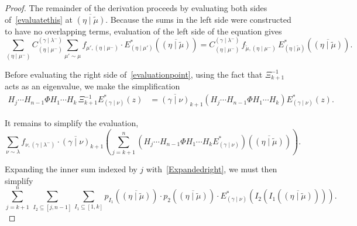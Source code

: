 \documentclass[11pt]{article}
\theoremstyle{definition}
\numberwithin{equation}{section}
\newcommand{\Estar}[1]{E^*_{#1}}
\newcommand{\gammalambdamin}{{(\gamma \mid \lambda^-)}}
\newcommand{\gammanu}{{(\gamma \mid \nu)}}
\newcommand{\etamu}{{(\eta \mid \mu^-)}}
\newcommand{\etamuprime}{{(\eta \mid \mu')}}
\newcommand{\mutilde}{{\widetilde{\mu}}}
\newcommand{\etamutilde}{{(\eta \mid \widetilde{\mu})}}
\newcommand{\pIoneevaluated}{p_{I_1}\left(\overline{\etamutilde}\right)}
\newcommand{\pItwoevaluated}{p_{2}\left(\overline{\etamutilde}\right)}
\newcommand{\fnu}{f_{\nu, \gammalambdamin}}
\newcommand{\gmutilde}{f_{\mutilde,\etamu}}
\begin{document}
\begin{proof}The remainder of the derivation proceeds by evaluating both sides of~\eqref{evaluatethis} at $\overline{\etamutilde}$. Because the sums in the left side were constructed to have no overlapping terms, evaluation of the left side of the equation gives
\[ \sum_{\etamu} C^{\gammalambdamin}_{\etamu} \sum_{\mu' \sim \mu} f_{\mu',\etamu} \cdot \Estar{\etamuprime}\left(\overline{(\eta \mid \widetilde{\mu})}\right)= C^{\gammalambdamin}_{\etamu} \, \gmutilde \,\Estar{\etamutilde} \left( \overline{\etamutilde}\right). \]

Before evaluating the right side of~\eqref{evaluationpoint}, using the fact that $\Xi^{-1}_{k+1}$ acts as an eigenvalue, we make the simplification
\begin{align*}
    H_j \dotsm H_{n-1} \Phi H_1 \dotsm H_{k} \, \Xi_{k+1}^{-1}   \Estar{\gammanu}(z) 
    &=\overline{\gammanu}_{k+1} \left( H_j \dotsm H_{n-1} \Phi H_1 \dotsm H_{k} \right)  \Estar{\gammanu}(z).
\end{align*}

It remains to simplify the evaluation,
\begin{equation}\label{unsimplifiedsum} \sum_{\nu \sim \lambda} \fnu \cdot \overline{\gammanu}_{k+1} \left( \sum_{j=k+1}^n   \left( H_j \dotsm H_{n-1} \Phi H_1 \dotsm H_{k} \Estar{\gammanu} \right)\left(\overline{\etamutilde}\right)\right).\end{equation}

Expanding the inner sum indexed by $j$ with~\eqref{Expandedright}, we must then simplify
\[  \sum_{j=k+1}^n \,   \sum_{I_2\subseteq [j, n-1]} \sum_{I_1 \subseteq [1,k]}\pIoneevaluated \cdot \pItwoevaluated \cdot \Estar{\gammanu}\left(I_2\left(I_1\left(\overline{\etamutilde}\right)\right)\right).\]


\end{proof}
\end{document}
